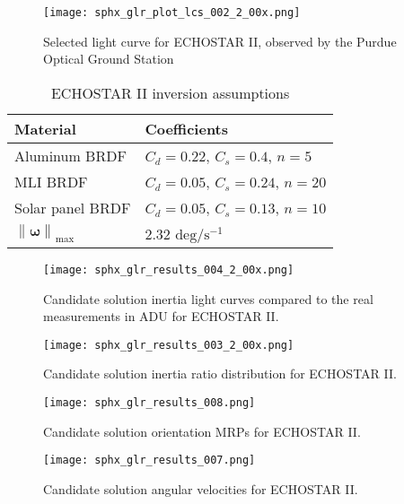 \documentclass[a4paper,twocolumn]{spaceDebrisC} %
\newcommand{\vctr}[1]{\bm{#1}}
\newcommand{\norm}[1]{\left\lVert#1\right\rVert}
\newcommand{\figbig}[0]{0.5\textwidth}
\newcommand{\figmed}[0]{0.4\textwidth}
\begin{document}
\begin{figure}[H]
  \centering
  \texttt{[image: sphx\_glr\_plot\_lcs\_002\_2\_00x.png]}
  \caption{Selected light curve for ECHOSTAR II, observed by the Purdue Optical Ground Station}
  \label{fig:sat_lc_obs}
\end{figure}

\begin{table}[H]
  \centering
  \caption{ECHOSTAR II inversion assumptions}
  \vspace*{6pt}
  \begin{tabular}{|l|l|}
  \hline
  \textbf{Material} & \textbf{Coefficients} \\ \hline
 Aluminum BRDF & $C_d=0.22$, $C_s=0.4$, $n=5$ \\ \hline
 MLI BRDF & $C_d=0.05$, $C_s=0.24$, $n=20$ \\ \hline
 Solar panel BRDF & $C_d=0.05$, $C_s=0.13$, $n=10$ \\ \hline
  $\norm{\vctr{\omega}}_\text{max}$ & $2.32$ $\text{deg} / \text{s}^{-1}$ \\ \hline
  \end{tabular}
  \label{tb:case2_ass}
\end{table}

\begin{figure*}[t]
  \centering
  \texttt{[image: sphx\_glr\_results\_004\_2\_00x.png]}
  \caption{Candidate solution inertia light curves compared to the real measurements in ADU for ECHOSTAR II.}
  \label{fig:case2_s}
\end{figure*}

\begin{figure}[H]
  \centering
  \texttt{[image: sphx\_glr\_results\_003\_2\_00x.png]}
  \caption{Candidate solution inertia ratio distribution for ECHOSTAR II.}
  \label{fig:case2_i}
\end{figure}

\begin{figure}[H]
  \centering
  \texttt{[image: sphx\_glr\_results\_008.png]}
  \caption{Candidate solution orientation MRPs for ECHOSTAR II.}
  \label{fig:case2_p}
\end{figure}

\begin{figure}[H]
  \centering
  \texttt{[image: sphx\_glr\_results\_007.png]}
  \caption{Candidate solution angular velocities for ECHOSTAR II.}
  \label{fig:case2_w}
\end{figure}
\end{document}
